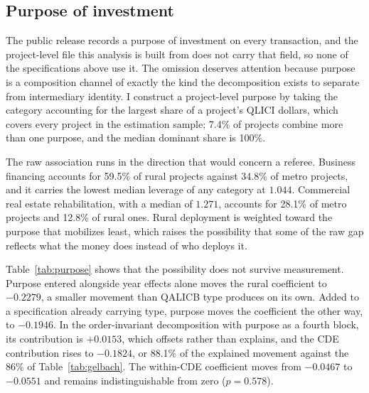 \begin{table}[t]
\centering
\caption{Robustness of the within-CDE rural coefficient. All rows except
the first include year, QALICB-type, and CDE fixed effects with
CDE-clustered standard errors. $^{***}p<0.01$, $^{**}p<0.05$,
$^{*}p<0.10$.}
\label{tab:robust}

\end{table}

\subsection{Purpose of investment}\label{sec:purpose}

The public release records a purpose of investment on every transaction,
and the project-level file this analysis is built from does not carry that
field, so none of the specifications above use it. The omission deserves
attention because purpose is a composition channel of exactly the kind the
decomposition exists to separate from intermediary identity. I construct a
project-level purpose by taking the category accounting for the largest
share of a project's QLICI dollars, which covers every project in the
estimation sample; 7.4\% of projects combine more than one purpose, and the
median dominant share is 100\%.

The raw association runs in the direction that would concern a referee.
Business financing accounts for 59.5\% of rural projects against 34.8\% of
metro projects, and it carries the lowest median leverage of any category
at $1.044$. Commercial real estate rehabilitation, with a median of
$1.271$, accounts for 28.1\% of metro projects and 12.8\% of rural ones.
Rural deployment is weighted toward the purpose that mobilizes least, which
raises the possibility that some of the raw gap reflects what the money
does instead of who deploys it.

Table~\ref{tab:purpose} shows that the possibility does not survive
measurement. Purpose entered alongside year effects alone moves the rural
coefficient to $-0.2279$, a smaller movement than QALICB type produces on
its own. Added to a specification already carrying type, purpose moves the
coefficient the other way, to $-0.1946$. In the order-invariant
decomposition with purpose as a fourth block, its contribution is
$+0.0153$, which offsets rather than explains, and the CDE contribution
rises to $-0.1824$, or 88.1\% of the explained movement against the 86\%
of Table~\ref{tab:gelbach}. The within-CDE coefficient moves from $-0.0467$
to $-0.0551$ and remains indistinguishable from zero ($p = 0.578$).

